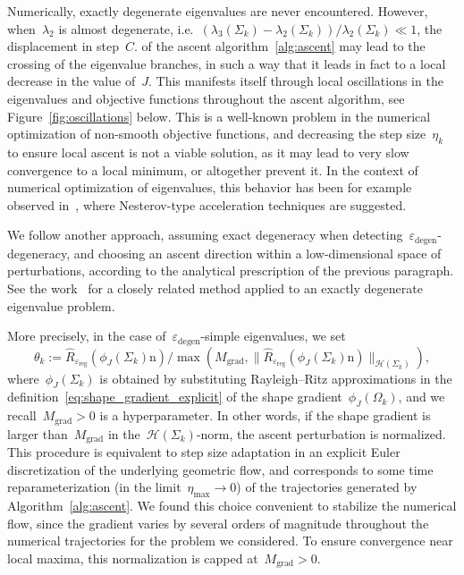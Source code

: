 \documentclass[a4]{article}
\newcommand{\n}{\mathrm{n}}
\newcommand{\reg}{\mathrm{reg}}
\newcommand{\1}{\mathbbm 1}
\begin{document}
Numerically, exactly degenerate eigenvalues are never encountered. However, when~$\lambda_2$ is almost degenerate, i.e.~$(\lambda_3(\Sigma_k)-\lambda_2(\Sigma_k))/\lambda_2(\Sigma_k) \ll 1$, the displacement in step~$C.$ of the ascent algorithm~\ref{alg:ascent} may lead to the crossing of the eigenvalue branches, in such a way that it leads in fact to a local decrease in the value of~$J$.
This manifests itself through local oscillations in the eigenvalues and objective functions throughout the ascent algorithm, see Figure~\ref{fig:oscillations} below.
This is a well-known problem in the numerical optimization of non-smooth objective functions, and decreasing the step size~$\eta_k$ to ensure local ascent is not a viable solution, as it may lead to very slow convergence to a local minimum, or altogether prevent it.
In the context of numerical optimization of eigenvalues, this behavior has been for example observed in~\cite{CTZ24}, where Nesterov-type acceleration techniques are suggested.

We follow another approach, assuming exact degeneracy when detecting~$\varepsilon_{\mathrm{degen}}$-degeneracy, and choosing an ascent direction within a low-dimensional space of perturbations, according to the analytical prescription of the previous paragraph.
See the work~\cite{DG06} for a closely related method applied to an exactly degenerate eigenvalue problem.

More precisely, in the case of~$\varepsilon_{\mathrm{degen}}$-simple eigenvalues, we set
\begin{equation}
    \theta_k := \widehat{R}_{\varepsilon_\reg}(\phi_J(\Sigma_k)\n) / \max\left(M_{\mathrm{grad}},\|\widehat{R}_{\varepsilon_\reg}(\phi_J(\Sigma_k)\n)\|_{\mathcal H(\Sigma_k)}\right),
\end{equation}
where~$\phi_J(\Sigma_k)$ is obtained by substituting Rayleigh--Ritz approximations in the definition~\eqref{eq:shape_gradient_explicit} of the shape gradient~$\phi_J(\Omega_k)$, and we recall~$M_{\mathrm{grad}}>0$ is a hyperparameter.
In other words, if the shape gradient is larger than~$M_{\mathrm{grad}}$ in the~$\mathcal H(\Sigma_k)$-norm, the ascent perturbation is normalized. This procedure is equivalent to step size adaptation in an explicit Euler discretization of the underlying geometric flow, and corresponds to some time reparameterization (in the limit~$\eta_{\max}\to 0$) of the trajectories generated by Algorithm~\ref{alg:ascent}.
We found this choice convenient to stabilize the numerical flow, since the gradient varies by several orders of magnitude throughout the numerical trajectories for the problem we considered. To ensure convergence near local maxima, this normalization is capped at~$M_{\mathrm{grad}}>0$.
\end{document}
